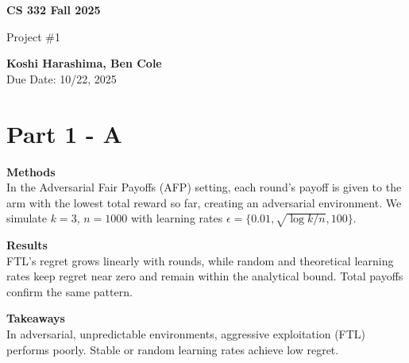 \documentclass[10pt]{article}
\renewenvironment{shaded}{%
  \def\FrameCommand{\fboxsep=\FrameSep \colorbox{shadecolor}}%
  \MakeFramed{\advance\hsize-\width \FrameRestore\FrameRestore}}%
 {\endMakeFramed}
\begin{document}
\graphicspath{{../figures/}{figures/}{332Project2/figures/}}

\begin{titlepage}
   \begin{center}
       \vspace*{9cm}

       \textbf{CS 332 Fall 2025}

       \vspace{0.5cm}
        Project \#1
        \vfill

       \textbf{Koshi Harashima, Ben Cole}\\
       Due Date: 10/22, 2025
            
   \end{center}
\end{titlepage}

\pagebreak


\section{Part 1 - A}
\begin{shaded}
\textbf{Methods}\\
In the Adversarial Fair Payoffs (AFP) setting, each round’s payoff is given to the arm with the lowest total reward so far, creating an adversarial environment.  
We simulate $k=3$, $n=1000$ with learning rates $\epsilon=\{0.01, \sqrt{\log k/n}, 100\}$.

\textbf{Results}\\
FTL’s regret grows linearly with rounds, while random and theoretical learning rates keep regret near zero and remain within the analytical bound.  
Total payoffs confirm the same pattern.

\textbf{Takeaways}\\
In adversarial, unpredictable environments, aggressive exploitation (FTL) performs poorly.  
Stable or random learning rates achieve low regret.
\end{shaded}
\end{document}
